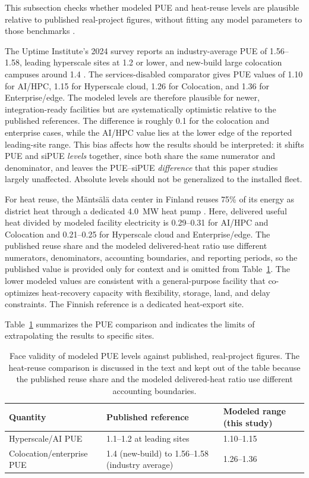 \documentclass[preprint,12pt]{elsarticle}
\begin{document}
This subsection checks whether modeled PUE and heat-reuse levels are plausible relative to published real-project figures, without fitting any model parameters to those benchmarks \cite{UptimeInstitute2024Survey,EUSmartCities2024Mantsala}.

The Uptime Institute's 2024 survey reports an industry-average PUE of 1.56--1.58, leading hyperscale sites at 1.2 or lower, and new-build large colocation campuses around 1.4 \cite{UptimeInstitute2024Survey}. The services-disabled comparator gives PUE values of 1.10 for AI/HPC, 1.15 for Hyperscale cloud, 1.26 for Colocation, and 1.36 for Enterprise/edge. The modeled levels are therefore plausible for newer, integration-ready facilities but are systematically optimistic relative to the published references. The difference is roughly 0.1 for the colocation and enterprise cases, while the AI/HPC value lies at the lower edge of the reported leading-site range. This bias affects how the results should be interpreted: it shifts PUE and siPUE \emph{levels} together, since both share the same numerator and denominator, and leaves the PUE--siPUE \emph{difference} that this paper studies largely unaffected. Absolute levels should not be generalized to the installed fleet.

For heat reuse, the M\"ants\"al\"a data center in Finland reuses 75\% of its energy as district heat through a dedicated 4.0~MW heat pump \cite{EUSmartCities2024Mantsala}. Here, delivered useful heat divided by modeled facility electricity is 0.29--0.31 for AI/HPC and Colocation and 0.21--0.25 for Hyperscale cloud and Enterprise/edge. The published reuse share and the modeled delivered-heat ratio use different numerators, denominators, accounting boundaries, and reporting periods, so the published value is provided only for context and is omitted from Table~\ref{tab:face-validity}. The lower modeled values are consistent with a general-purpose facility that co-optimizes heat-recovery capacity with flexibility, storage, land, and delay constraints. The Finnish reference is a dedicated heat-export site.

Table~\ref{tab:face-validity} summarizes the PUE comparison and indicates the limits of extrapolating the results to specific sites.

\begin{table}[tbp]
\centering
\small
\caption{Face validity of modeled PUE levels against published, real-project figures. The heat-reuse comparison is discussed in the text and kept out of the table because the published reuse share and the modeled delivered-heat ratio use different accounting boundaries.}
\label{tab:face-validity}
\begin{tabularx}{\linewidth}{l X X}
\toprule
Quantity & Published reference & Modeled range (this study) \\
\midrule
Hyperscale/AI PUE & 1.1--1.2 at leading sites \cite{UptimeInstitute2024Survey} & 1.10--1.15 \\
Colocation/enterprise PUE & 1.4 (new-build) to 1.56--1.58 (industry average) \cite{UptimeInstitute2024Survey} & 1.26--1.36 \\
\bottomrule
\end{tabularx}
\end{table}
\end{document}
